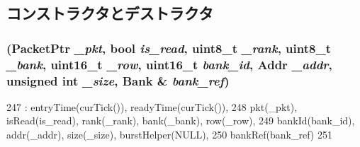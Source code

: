 \subsection{コンストラクタとデストラクタ}
\hypertarget{classDRAMCtrl_1_1DRAMPacket_a80655cee61e7cbc2d5dff02d112876e2}{
\subsubsection[{DRAMPacket}]{ ({\bf PacketPtr} {\em \_\-pkt}, \/  bool {\em is\_\-read}, \/  uint8\_\-t {\em \_\-rank}, \/  uint8\_\-t {\em \_\-bank}, \/  uint16\_\-t {\em \_\-row}, \/  uint16\_\-t {\em bank\_\-id}, \/  {\bf Addr} {\em \_\-addr}, \/  unsigned int {\em \_\-size}, \/  {\bf Bank} \& {\em bank\_\-ref})}}
\label{classDRAMCtrl_1_1DRAMPacket_a80655cee61e7cbc2d5dff02d112876e2}



\begin{DoxyCode}
247             : entryTime(curTick()), readyTime(curTick()),
248               pkt(_pkt), isRead(is_read), rank(_rank), bank(_bank), row(_row),
249               bankId(bank_id), addr(_addr), size(_size), burstHelper(NULL),
250               bankRef(bank_ref)
251         { }
\end{DoxyCode}


